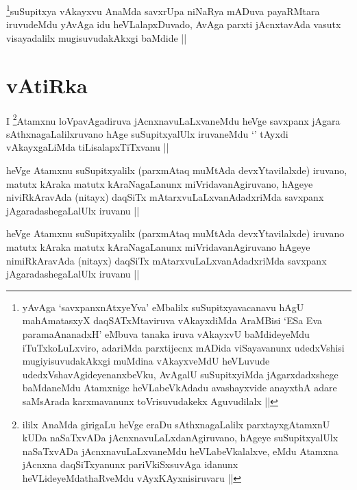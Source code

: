 
\begin{artha}
\footnote[2]{yAvAga `savxpanxnAtxyeYva'
  eMbalilx suSupitxyavacanavu hAgU mahAmatasxyX daqSATxMtaviruva
  vAkayxdiMda AraMBisi `ESa Eva paramaAnanadxH' eMbuva tanaka iruva
  vAkayxvU baMdideyeMdu iTuTxkoLuLxviro, adariMda parxtijecnx mADida
  viSayavanunx udedxVshisi mugiyisuvudakAkxgi muMdina vAkayxveMdU
  heVLuvude udedxVshavAgideyenanxbeVku, AvAgalU suSupitxyiMda
  jAgarxdadxshege baMdaneMdu Atamxnige heVLabeVkAdadu avashayxvide
  anayxthA adare saMsArada karxmavanunx toVrisuvudakekx Aguvudilalx ||}suSupitxya vAkayxvu AnaMda savxrUpa
niNaRya mADuva payaRMtara iruvudeMdu yAvAga idu heVLalapxDuvado, AvAga
parxti jAcnxtavAda vasutx visayadalilx mugisuvudakAkxgi baMdide ||
\end{artha}

\section*{vAtiRka}


\begin{artha}
I \footnote[1]{ililx AnaMda girigaLu heVge eraDu sAthxnagaLalilx
  parxtayxgAtamxnU kUDa naSaTxvADa jAcnxnavuLaLxdanAgiruvano, hAgeye
  suSupitxyalUlx naSaTxvADa jAcnxnavuLaLxvaneMdu heVLabeVkalalxve,
  eMdu Atamxna jAcnxna daqSiTxyanunx pariVkiSxsuvAga idanunx
  heVLideyeMdathaRveMdu vAyxKAyxnisiruvaru ||}Atamxnu loVpavAgadiruva jAcnxnavuLaLxvaneMdu heVge
savxpanx jAgara sAthxnagaLalilxruvano hAge suSupitxyalUlx iruvaneMdu
`\stext' tAyxdi vAkayxgaLiMda tiLisalapxTiTxvanu ||
\end{artha}


\begin{artha}
heVge Atamxnu suSupitxyalilx (parxmAtaq muMtAda devxYtavilalxde)
iruvano, matutx kAraka matutx kAraNagaLanunx miVridavanAgiruvano,
hAgeye niviRkAravAda (nitayx) daqSiTx mAtarxvuLaLxvanAdadxriMda
savxpanx jAgaradashegaLalUlx iruvanu ||
\end{artha}


\begin{artha}
heVge Atamxnu suSupitxyalilx (parxmAtaq muMtAda devxYtavilalxde)
iruvano matutx kAraka matutx kAraNagaLanunx miVridavanAgiruvano hAgeye
nimiRkAravAda (nitayx) daqSiTx mAtarxvuLaLxvanAdadxriMda savxpanx
jAgaradashegaLalUlx iruvanu ||
\end{artha}

